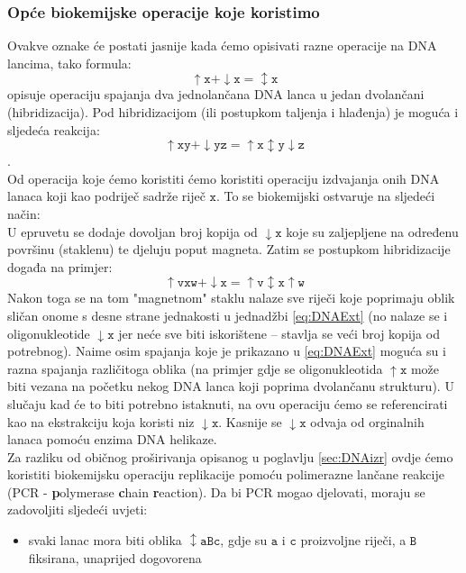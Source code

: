 \documentclass[a4paper,oneside,12pt]{memoir} %
\begin{document}
\begin{spacing}{1.5}
\subsubsection{Opće biokemijske operacije koje koristimo}
Ovakve oznake će postati jasnije kada ćemo opisivati razne operacije  na DNA lancima, tako formula:
\[\mathtt{\uparrow x + \downarrow x=\updownarrow x}\]
opisuje operaciju spajanja dva jednolančana DNA lanca u jedan dvolančani (hibridizacija). Pod hibridizacijom (ili postupkom taljenja i hlađenja) je moguća i sljedeća reakcija:
\[\mathtt{\uparrow xy + \downarrow yz = \uparrow x \updownarrow y \downarrow z}\].\\
Od operacija koje ćemo koristiti ćemo koristiti operaciju izdvajanja onih DNA lanaca koji kao podriječ sadrže riječ $\mathtt{x}$. To se biokemijski ostvaruje na sljedeći način:\\
U epruvetu se dodaje dovoljan broj kopija od $\mathtt{\downarrow x}$ koje su zaljepljene na određenu površinu (staklenu) te djeluju poput magneta. Zatim se postupkom hibridizacije događa na primjer:
\begin{equation}
\label{eq:DNAExt}
\mathtt{\uparrow vxw + \downarrow x = \uparrow v \updownarrow x \uparrow w}
\end{equation}
Nakon toga se na tom "magnetnom" staklu nalaze sve riječi koje poprimaju oblik sličan onome s desne strane jednakosti u jednadžbi \ref{eq:DNAExt} (no nalaze se i oligonukleotide $\mathtt{\downarrow x}$ jer neće sve biti iskorištene -- stavlja se veći broj kopija od potrebnog). Naime osim spajanja koje je prikazano u \ref{eq:DNAExt} moguća su i razna spajanja različitoga oblika (na primjer gdje se oligonukleotida $\mathtt{\uparrow x}$ može biti vezana na početku nekog DNA lanca koji poprima dvolančanu strukturu). U slučaju kad će to biti potrebno istaknuti, na ovu operaciju ćemo se referencirati kao na ekstrakciju koja koristi niz $\mathtt{\downarrow x}$. Kasnije se $\mathtt{\downarrow x}$ odvaja od orginalnih lanaca pomoću enzima DNA helikaze.\\[0.5cm]
Za razliku od običnog proširivanja opisanog u poglavlju \ref{sec:DNAizr} ovdje ćemo koristiti biokemijsku operaciju replikacije pomoću polimerazne lančane reakcije (PCR - \textbf{p}olymerase \textbf{c}hain \textbf{r}eaction). Da bi PCR mogao djelovati, moraju se zadovoljiti sljedeći uvjeti:
\begin{itemize}
\item svaki lanac mora biti oblika $\mathtt{\updownarrow aBc}$, gdje su $\mathtt{a}$ i $\mathtt{c}$ proizvoljne riječi, a $\mathtt{B}$ fiksirana, unaprijed dogovorena

\end{itemize}
\end{spacing}
\end{document}
